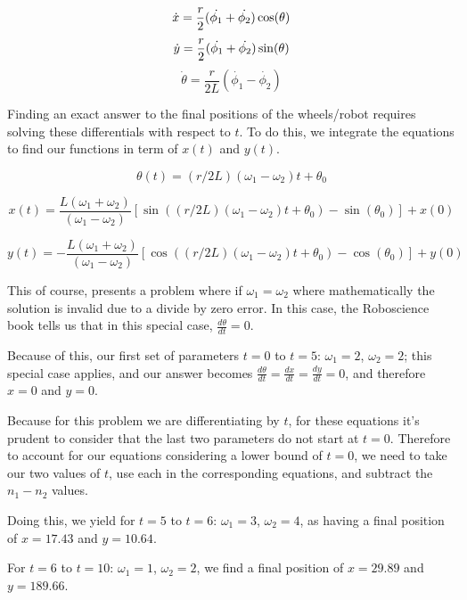 \documentclass[letterpaper,11pt]{texMemo} %
\begin{document}
\[\dot{x} = \frac{r}{2} (\dot{\phi_1}+\dot{\phi_2})\cos(\theta) \\[4mm]\]
\[\dot{y} = \frac{r}{2} (\dot{\phi_1}+\dot{\phi_2})\sin(\theta) \\[4mm]\]
\[\dot{\theta} = \frac{r}{2L} (\dot{\phi_1}-\dot{\phi_2})\]

Finding an exact answer to the final positions of the wheels/robot requires solving
these differentials with respect to $t$. To do this, we integrate the equations to find 
our functions in term of $x(t)$ and $y(t)$.

\[\theta(t) = (r/2L)(\omega_1 - \omega_2)t + \theta_0\]

\[x(t) = \frac{L(\omega_1 + \omega_2)}{(\omega_1 - \omega_2)} \left[\sin((r/2L)(\omega_1 - \omega_2)t + \theta_0) - \sin(\theta_0)\right] + x(0)\]

\[y(t) = -\frac{L(\omega_1 + \omega_2)}{(\omega_1 - \omega_2)} \left[\cos((r/2L)(\omega_1 - \omega_2)t + \theta_0) - \cos(\theta_0)\right]+ y(0)\]

This of course, presents a problem where if $\omega_1 = \omega_2$ where mathematically the solution is invalid due to
a divide by zero error. In this case, the Roboscience book tells us that in this special case, $\frac{d\theta}{dt} = 0$.

Because of this, our first set of parameters $t=0$ to $t=5$: $\omega_1=2$, $\omega_2=2$; this special case applies, and our answer becomes 
$\frac{d\theta}{dt} = \frac{dx}{dt} = \frac{dy}{dt} = 0$, and therefore $x=0$ and $y=0$.

Because for this problem we are differentiating by $t$, for these equations it's prudent to consider 
that the last two parameters do not start at $t=0$. Therefore to account for our equations considering
a lower bound of $t=0$, we need to take our two values of $t$, use each in the corresponding equations,
and subtract the $n_1-n_2$ values.

Doing this, we yield for $t=5$ to $t=6$: $\omega_1=3$, $\omega_2=4$, as having a final position of 
$x=17.43$ and $y=10.64$.

For $t=6$ to $t=10$: $\omega_1=1$, $\omega_2=2$, we find a final position of $x=29.89$ and $y=189.66$.
\end{document}
